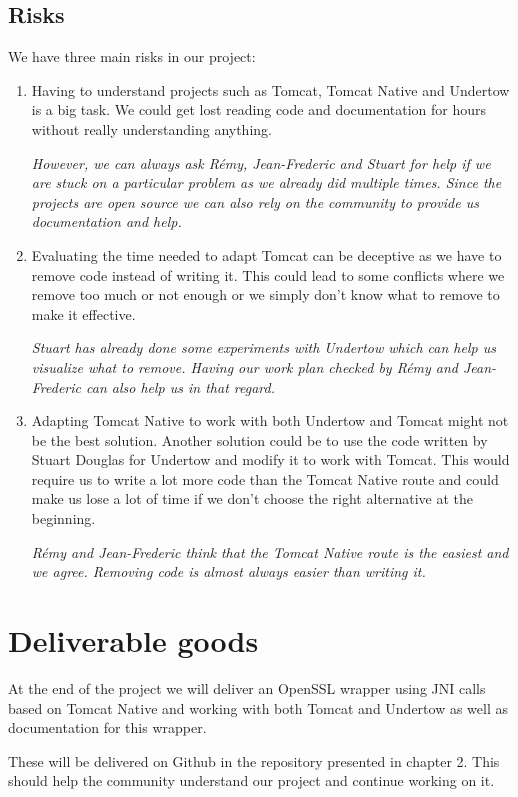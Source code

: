\documentclass[11pt,a4paper,bibliography=totocnumbered]{scrartcl}
\begin{document}
\subsection{Risks}
\label{subsec:risks}
We have three main risks in our project:
\begin{enumerate}
\item Having to understand projects such as Tomcat, Tomcat Native and Undertow is a big task. We could get lost reading code and documentation for hours without really understanding anything.

\textit{However, we can always ask Rémy, Jean-Frederic and Stuart for help if we are stuck on a particular problem as we already did multiple times. Since the projects are open source we can also rely on the community to provide us documentation and help.}

\item Evaluating the time needed to adapt Tomcat can be deceptive as we have to remove code instead of writing it. This could lead to some conflicts where we remove too much or not enough or we simply don't know what to remove to make it effective.

\textit{Stuart has already done some experiments with Undertow which can help us visualize what to remove. Having our work plan checked by Rémy and Jean-Frederic can also help us in that regard.}
\item Adapting Tomcat Native to work with both Undertow and Tomcat might not be the best solution. Another solution could be to use the code written by Stuart Douglas for Undertow and modify it to work with Tomcat. This would require us to write a lot more code than the Tomcat Native route and could make us lose a lot of time if we don't choose the right alternative at the beginning.

\textit{Rémy and Jean-Frederic think that the Tomcat Native route is the easiest and we agree. Removing code is almost always easier than writing it.}
\end{enumerate}


\section{Deliverable goods}

At the end of the project we will deliver an OpenSSL wrapper using JNI calls based on Tomcat Native and working with both Tomcat and Undertow as well as documentation for this wrapper.

These will be delivered on Github in the repository presented in chapter 2. This should help the community understand our project and continue working on it.
\end{document}
